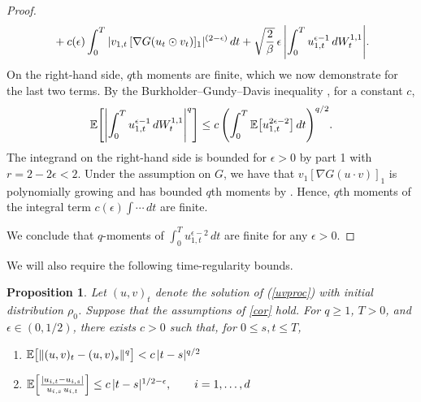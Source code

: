 \documentclass[11pt, twoside]{report}
\newtheorem{proposition}[theorem]{Proposition}
\begin{document}
\begin{proof}
\begin{align*}
&\quad+ c(\epsilon)\int_0^T |v_{1,t} \,[\nabla G(u_t\odot v_t)]_1|^{(2-\epsilon)}\,dt+\sqrt\frac{2}{\beta} \,\epsilon\,\abs{\int_0^T u_{1,t}^{\epsilon-1}\,dW^{1,1}_t}.
\end{align*}
On the right-hand side, $q$th moments are finite, which we now demonstrate for the last two terms. By the Burkholder--Gundy--Davis inequality \cite[Theorem 3.28]{Karatzas1991-xr}, for a constant $c$,
\[
\mean{\abs{\int_0^T u_{1,t}^{\epsilon-1}\,dW^{1,1}_t}^q}
\le c\,
\pp{\int_0^T \mean{u_{1,t}^{2\epsilon-2}}\,dt}^{q/2}.
\]
The integrand on the right-hand side is bounded for $\epsilon>0$ by part 1 with $r=2-2\epsilon<2$. 
Under the assumption on $G$, we have that $v_1 [\nabla G (u\cdot v)]_1$ is polynomially growing and has bounded $q$th moments by \cite[Theorem~3.1]{2025hadalangsamp}.  Hence, $q$th moments of the integral term $c(\epsilon)\int \cdots\,dt$ are finite.
   
   We conclude that $q$-moments of $\int_0^T {u_{1,t}^{\epsilon-2}}\,dt$ are finite for any $\epsilon>0$.
\end{proof}
We will also require the following time-regularity bounds. 
\begin{proposition} \label{timeregbnd} Let $(u,v)_t$ denote the solution of (\ref{uvproc}) with initial distribution $\rho_0$. Suppose that the assumptions of \ref{cor} hold. For $q\ge 1$, $T>0$, and $\epsilon\in(0,1/2)$,  there exists $c>0$ such that, for $0\le s,t\le T$,
\begin{enumerate}
    \item $\mathbb{E} \bp{ {\|(u,v)_t-(u,v)_s\|^q}\strutb}<c\, |t-s|^{q/2}$
    \item $\mathbb{E} \bp{\frac {|u_{i,t}-u_{i,s}|}{u_{i,s}\,u_{i,t}}}\le c\, |t-s|^{1/2-\epsilon},\qquad i=1,\dots,d$
\end{enumerate}

\end{proposition}
\end{document}

